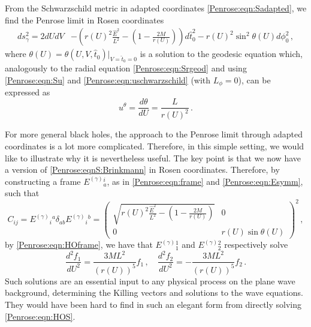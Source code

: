 From the Schwarzschild metric  in adapted coordinates \eqref{Penrose:eqn:Sadapted}, we find the Penrose limit in Rosen coordinates
\begin{equation}\label{Penrose:eqn:Sadaptedlimit}
\begin{aligned}
ds^2_{\gamma} =  
2 dU dV&- \left(r(U)^2 \frac{\hat{E}^2}{L^2}-\left(1-\frac{2M}{r(U)}\right)\right)d\hat{t}_0^2 - r(U)^2 \sin^2\theta(U) d \phi_0^2  \, ,
\end{aligned}
\end{equation}
where $\theta(U) = \theta(U,V,\hat{t}_0)|_{V=\hat{t}_0=0}$ is a solution to the geodesic equation which, analogously to the radial equation \eqref{Penrose:eqn:Srgeod} and using \eqref{Penrose:eqn:Su} and \eqref{Penrose:eqn:uschwarzschild} (with $L_{\phi} = 0$), can be expressed as
\begin{equation}
u^{\theta} = \frac{d\theta}{dU} = \frac{L}{r(U)^2} \, .
\end{equation}

For more general black holes, the approach to the Penrose limit through adapted coordinates is a lot more complicated. Therefore, in this simple setting, we would like to illustrate why it is nevertheless useful. The key point is that we now have a version of \eqref{Penrose:eqnS:Brinkmann} in Rosen coordinates. Therefore, by constructing a frame $E^{(\gamma)}{}^i_{a}$, as in \eqref{Penrose:eqn:frame} and \eqref{Penrose:eqn:Esymm}, such that
\begin{equation}
C_{ij} = E^{(\gamma)}{}_i{}^{a} \delta_{ab} E^{(\gamma)}{}_i{}^{b} =\begin{pmatrix}
\sqrt{r(U)^2 \frac{\hat{E}^2}{L^2}-\left(1-\frac{2M}{r(U)}\right)} &  0 \\
0 & r(U) \sin \theta(U)  
\end{pmatrix}^2 \, ,
\end{equation} 
by \eqref{Penrose:eqn:HOframe}, we have that $E^{(\gamma)}{}^1_{1}$ and $E^{(\gamma)}{}^2_{2}$ respectively solve 
\begin{equation}\label{Penrose:eqn:HOS}
\frac{d^2f_1}{dU^2} = \frac{3 M L^2}{\left(r(U)\right)^5}f_1 \, ,  \quad  	\frac{d^2f_2}{dU^2} = -\frac{3 M L^2}{\left(r(U)\right)^5}f_2\, .
\end{equation}
Such solutions are an essential input to any physical process on the plane wave background, determining the Killing vectors and solutions to the wave equations. They would have been hard to find in such an elegant form from directly solving \eqref{Penrose:eqn:HOS}.


